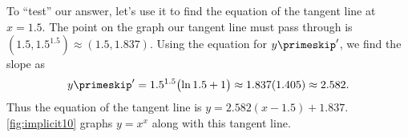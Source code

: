\begin{example}
To ``test'' our answer, let's use it to find the equation of the tangent line at $x=1.5$. The point on the graph our tangent line must pass through is $(1.5, 1.5^{1.5}) \approx (1.5, 1.837)$. Using the equation for $y\primeskip'$, we find the slope as
\[y\primeskip' = 1.5^{1.5}\bigl(\ln 1.5+1\bigr) \approx 1.837(1.405) \approx 2.582.\]
Thus the equation of the tangent line is $y = 2.582(x-1.5)+1.837$. \autoref{fig:implicit10} graphs $y=x^x$ along with this tangent line.
\end{example}



